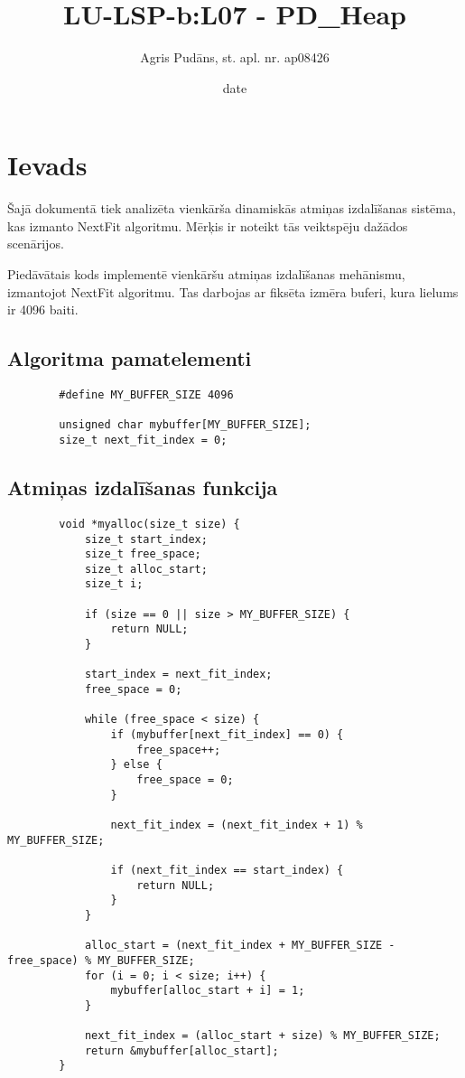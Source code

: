 \documentclass{article}
\title{LU-LSP-b:L07 - PD\_Heap}
\author{Agris Pudāns,  st. apl. nr. ap08426}
\date{date}
\begin{document}
	
	\maketitle
	
	\section{Ievads}
	
	Šajā dokumentā tiek analizēta vienkārša dinamiskās atmiņas izdalīšanas sistēma, kas izmanto NextFit algoritmu. Mērķis ir noteikt tās veiktspēju dažādos scenārijos.
	
	Piedāvātais kods implementē vienkāršu atmiņas izdalīšanas mehānismu, izmantojot NextFit algoritmu. Tas darbojas ar fiksēta izmēra buferi, kura lielums ir 4096 baiti.
	
	\subsection{Algoritma pamatelementi}
	
	\begin{verbatim}
		#define MY_BUFFER_SIZE 4096
		
		unsigned char mybuffer[MY_BUFFER_SIZE];
		size_t next_fit_index = 0;
	\end{verbatim}
	
	\subsection{Atmiņas izdalīšanas funkcija}
	
	\begin{verbatim}
		void *myalloc(size_t size) {
			size_t start_index;
			size_t free_space;
			size_t alloc_start;
			size_t i;
			
			if (size == 0 || size > MY_BUFFER_SIZE) {
				return NULL;
			}
			
			start_index = next_fit_index;
			free_space = 0;
			
			while (free_space < size) {
				if (mybuffer[next_fit_index] == 0) {
					free_space++;
				} else {
					free_space = 0;
				}
				
				next_fit_index = (next_fit_index + 1) % MY_BUFFER_SIZE;
				
				if (next_fit_index == start_index) {
					return NULL;
				}
			}
			
			alloc_start = (next_fit_index + MY_BUFFER_SIZE - free_space) % MY_BUFFER_SIZE;
			for (i = 0; i < size; i++) {
				mybuffer[alloc_start + i] = 1;
			}
			
			next_fit_index = (alloc_start + size) % MY_BUFFER_SIZE;
			return &mybuffer[alloc_start];
		}
	\end{verbatim}
	
\end{document}
